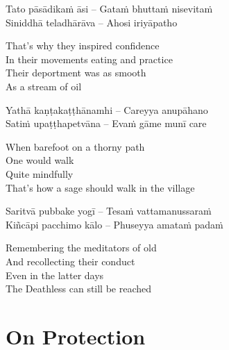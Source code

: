 \begin{twochants}
  Tato pāsādikaṁ āsi – Gataṁ bhuttaṁ nisevitaṁ\\
  Siniddhā teladhārāva – Ahosi iriyāpatho\\
\end{twochants}

\begin{english}
  That’s why they inspired confidence\\
  In their movements eating and practice\\
  Their deportment was as smooth\\
  As a stream of oil
\end{english}

\begin{twochants}
  Yathā kaṇṭakaṭṭhānamhi – Careyya anupāhano\\
  Satiṁ upaṭṭhapetvāna – Evaṁ gāme munī care\\
\end{twochants}

\begin{english}
  When barefoot on a thorny path\\
  One would walk\\
  Quite mindfully\\
  That’s how a sage should walk in the village
\end{english}

\begin{twochants}
  Saritvā pubbake yogī – Tesaṁ vattamanussaraṁ\\
  Kiñcāpi pacchimo kālo – Phuseyya amataṁ padaṁ\\
\end{twochants}

\begin{english}
  Remembering the meditators of old\\
  And recollecting their conduct\\
  Even in the latter days\\
  The Deathless can still be reached
\end{english}

\suttaRef{[Thag 16.10]}


\section{On Protection}
\label{protection}

